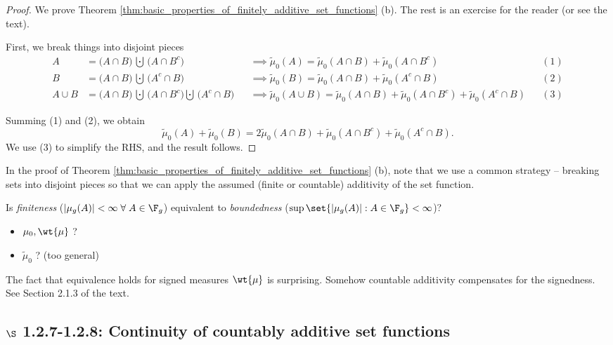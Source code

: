 \documentclass{article} %
\newif\ifActive
\newcommand{\fasf}{\tilde{\mu}_0}
\newcommand{\signedmu}{\wt{\mu}}
\begin{document}
\begin{proof}
 We prove Theorem \ref{thm:basic_properties_of_finitely_additive_set_functions} (b).  The rest is an exercise for the reader (or see the text).
 
 \ifActive 
\textbf{Workshop Exercise}: Prove part (b).
\else 
 First, we break things into disjoint pieces
 {\footnotesize 
\begin{align*}
A &= \bigg(A \cap B \bigg) \, \bigcupdot \, \bigg(A \cap B^c \bigg)	&& \implies \fasf(A) = \fasf (A \cap B) +  \fasf (A \cap B^c)  && (1) \\
B &= \bigg(A \cap B \bigg) \, \bigcupdot \, \bigg(A^c \cap B \bigg)	&& \implies \fasf(B) = \fasf (A \cap B) +  \fasf (A^c \cap B)  && (2) \\
A \cup B &= \bigg(A \cap B \bigg) \, \bigcupdot \, \bigg(A \cap B^c \bigg) \bigcupdot \, \bigg(A^c \cap B \bigg)	&& \implies \fasf(A \cup B) = \fasf (A \cap B) +  \fasf (A \cap B^c) + \fasf (A^c \cap B)   && (3) 
\end{align*}
}

Summing (1) and (2), we obtain
\[\fasf(A) + \fasf(B) = 2 \fasf(A \cap B) + \fasf(A \cap B^c) + \fasf(A^c \cap B). \]
We use (3) to simplify the RHS, and the result follows.
\fi 
\end{proof}

\begin{remark}
In the proof of Theorem \ref{thm:basic_properties_of_finitely_additive_set_functions} (b), note that we use a common strategy -- breaking sets into disjoint pieces so that we can apply the assumed (finite or countable) additivity of the set function. 
\end{remark}


\begin{remark}
Is \textit{finiteness} ($|\mu_g (A)| < \infty \; \forall \; A \in \F_g$) equivalent to \textit{boundedness} ($\sup \set{|\mu_g (A)| : A \in \F_g} < \infty$)?
\begin{itemize}
\item $\mu_0, \signedmu$ ? \greencheck
\item $\fasf$ ? \redx (too general)
\end{itemize}
The fact that equivalence holds for signed measures $\signedmu$ is surprising.  Somehow countable additivity compensates for the signedness. See Section 2.1.3 of the text. 
\end{remark}


\subsection{$\S$ 1.2.7-1.2.8: Continuity of countably additive set functions}
\end{document}
